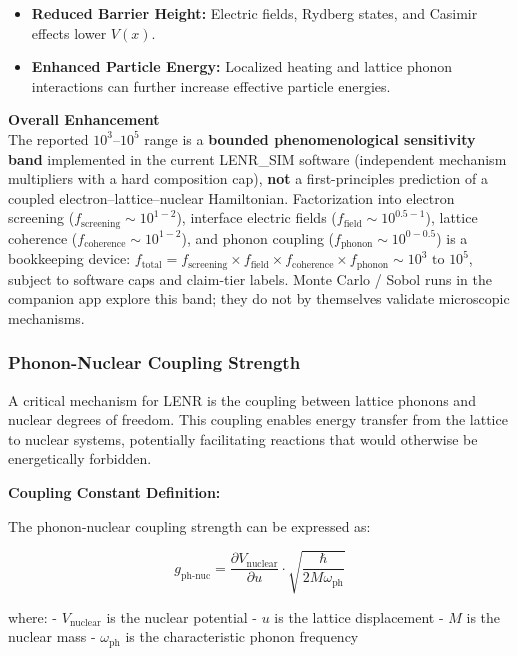 \documentclass[11pt,a4paper]{article}
\begin{document}
\begin{itemize}
\item
  \textbf{Reduced Barrier Height:} Electric fields, Rydberg states, and Casimir effects lower $V(x)$.
\item
  \textbf{Enhanced Particle Energy:} Localized heating and lattice phonon interactions can further increase effective particle energies.
\end{itemize}

\textbf{Overall Enhancement}\\
The reported $10^{3}$--$10^{5}$ range is a \textbf{bounded phenomenological sensitivity band} implemented in the current LENR\_SIM software (independent mechanism multipliers with a hard composition cap), \textbf{not} a first-principles prediction of a coupled electron--lattice--nuclear Hamiltonian. Factorization into electron screening ($f_{\text{screening}} \sim 10^{1-2}$), interface electric fields ($f_{\text{field}} \sim 10^{0.5-1}$), lattice coherence ($f_{\text{coherence}} \sim 10^{1-2}$), and phonon coupling ($f_{\text{phonon}} \sim 10^{0-0.5}$) is a bookkeeping device: $f_{\text{total}} = f_{\text{screening}} \times f_{\text{field}} \times f_{\text{coherence}} \times f_{\text{phonon}} \sim 10^{3} \text{ to } 10^{5}$, subject to software caps and claim-tier labels. Monte Carlo / Sobol runs in the companion app explore this band; they do not by themselves validate microscopic mechanisms.

\subsubsection{Phonon-Nuclear Coupling Strength}

A critical mechanism for LENR is the coupling between lattice phonons and nuclear degrees of freedom. This coupling enables energy transfer from the lattice to nuclear systems, potentially facilitating reactions that would otherwise be energetically forbidden.

\textbf{Coupling Constant Definition:}

The phonon-nuclear coupling strength can be expressed as:

\begin{equation}
g_{\text{ph-nuc}} = \frac{\partial V_{\text{nuclear}}}{\partial u} \cdot \sqrt{\frac{\hbar}{2M\omega_{\text{ph}}}}
\end{equation}

where: - $V_{\text{nuclear}}$ is the nuclear potential - $u$ is the lattice displacement - $M$ is the nuclear mass - $\omega_{\text{ph}}$ is the characteristic phonon frequency
\end{document}
